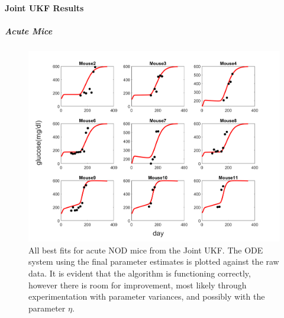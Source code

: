
\paragraph{Joint UKF Results}

\subparagraph{Acute Mice}

\begin{figure}[H]
    \centering
    \includegraphics[width=15cm]{Kalman_Filter_Images/joint_acute_all.png}
    \caption{All best fits for acute NOD mice from the Joint UKF. The ODE system using the final parameter estimates is plotted against the raw data. It is evident that the algorithm is functioning correctly, however there is room for improvement, most likely through experimentation with parameter variances, and possibly with the parameter $\eta$.}
    \label{fig:T1D_Joint_AllAcute_Plots}
\end{figure}

